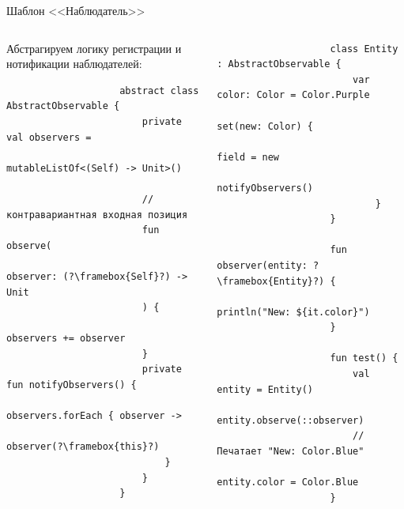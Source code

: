 \documentclass[aspectratio=169,usenames,dvipsnames]{beamer}
\begin{document}
    \begin{frame}[fragile]{Шаблон <<Наблюдатель>>}
        \begin{columns}
            \begin{column}{0.48\textwidth}
                Абстрагируем логику регистрации и нотификации наблюдателей:
                \begin{verbatim}
                    abstract class AbstractObservable {
                        private val observers =
                            mutableListOf<(Self) -> Unit>()

                        // контравариантная входная позиция
                        fun observe(
                            observer: (?\framebox{Self}?) -> Unit
                        ) {
                            observers += observer
                        }
                        private fun notifyObservers() {
                            observers.forEach { observer ->
                                observer(?\framebox{this}?)
                            }
                        }
                    }
                \end{verbatim}
            \end{column}

            \begin{column}{0.49\textwidth}
                \vspace{-0.5em}
                \begin{verbatim}
                    class Entity : AbstractObservable {
                        var color: Color = Color.Purple
                            set(new: Color) {
                                field = new
                                notifyObservers()
                            }
                    }

                    fun observer(entity: ?\framebox{Entity}?) {
                        println("New: ${it.color}")
                    }

                    fun test() {
                        val entity = Entity()
                        entity.observe(::observer)
                        // Печатает "New: Color.Blue"
                        entity.color = Color.Blue
                    }
                \end{verbatim}
            \end{column}
        \end{columns}
    \end{frame}
\end{document}
